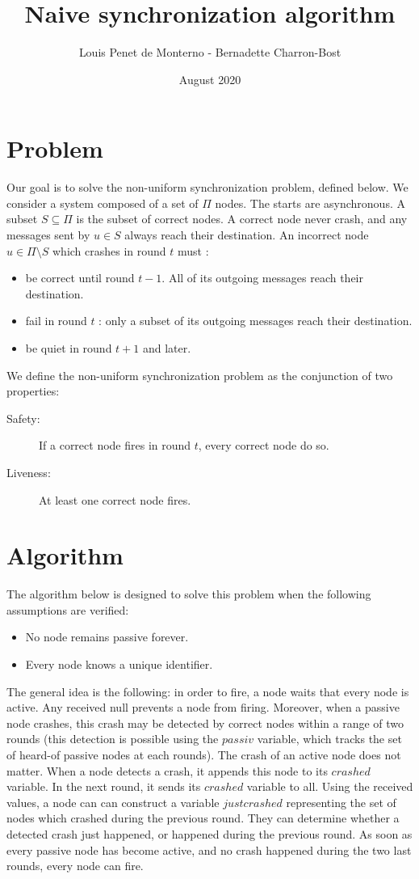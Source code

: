 \documentclass{article}
\title{Naive synchronization algorithm}
\date{August 2020}
\author{Louis Penet de Monterno - Bernadette Charron-Bost}
\begin{document}
\maketitle

\section{Problem}

Our goal is to solve the non-uniform synchronization problem, defined below.
We consider a system composed of a set of $\Pi$ nodes.
The starts are asynchronous.  A subset $S \subseteq \Pi$ is the subset of correct nodes.
A correct node never crash, and any messages sent by $u \in S$ always reach their destination.
An incorrect node $u \in \Pi \setminus S$ which crashes in round $t$ must :
\begin{itemize}
	\item be correct until round $t-1$. All of its outgoing messages reach their destination.
	\item fail in round $t$ : only a subset of its outgoing messages reach their destination.
	\item be quiet in round $t+1$ and later.
\end{itemize}

We define the non-uniform synchronization problem as the conjunction of two properties:
\begin{description}
	\item[Safety:] If a correct node fires in round $t$, every correct node do so.
	\item[Liveness:] At least one correct node fires.
\end{description}

\section{Algorithm}

The algorithm below is designed to solve this problem when the following assumptions are verified:
\begin{itemize}
	\item No node remains passive forever.	
	\item Every node knows a unique identifier.
\end{itemize}

The general idea is the following: in order to fire, a node waits that every node is active. Any received null prevents a node from firing.
Moreover, when a passive node crashes, this crash may be detected by correct nodes within a range of two rounds (this detection is possible using the $passiv$ variable,
which tracks the set of heard-of passive nodes at each rounds).
The crash of an active node does not matter.
When a node detects a crash, it appends this node to its $crashed$ variable.
In the next round, it sends its $crashed$ variable to all.
Using the received values, a node can can construct a variable $justcrashed$ representing the set of nodes which crashed during the previous round.
They can determine whether a detected crash just happened, or happened during the previous round.
As soon as every passive node has become active, and no crash happened during the two last rounds, every node can fire.
\end{document}
